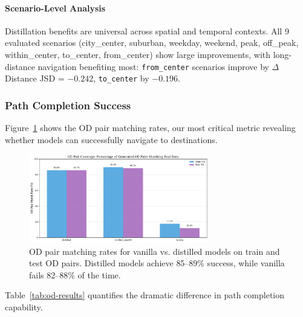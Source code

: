 \paragraph{Scenario-Level Analysis}
Distillation benefits are universal across spatial and temporal contexts. All 9 evaluated scenarios (city\_center, suburban, weekday, weekend, peak, off\_peak, within\_center, to\_center, from\_center) show large improvements, with long-distance navigation benefiting most: \texttt{from\_center} scenarios improve by $\Delta$ Distance JSD = $-0.242$, \texttt{to\_center} by $-0.196$.

\subsubsection{Path Completion Success}

Figure~\ref{fig:od-matching} shows the OD pair matching rates, our most critical metric revealing whether models can successfully navigate to destinations.

\begin{figure}[h]
    \centering
    \includegraphics[width=0.7\textwidth]{assets/plots/hoser/od_matching_rates.pdf}
    \caption{OD pair matching rates for vanilla vs. distilled models on train and test OD pairs. Distilled models achieve 85--89\% success, while vanilla fails 82--88\% of the time.}
    \label{fig:od-matching}
\end{figure}

Table~\ref{tab:od-results} quantifies the dramatic difference in path completion capability.

